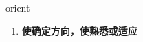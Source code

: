 
\begin{frame}
{\huge orient}
\begin{center}
\begin{enumerate}\Large
  \item \textbf{使确定方向，使熟悉或适应}
\end{enumerate}
\end{center}
\end{frame}
